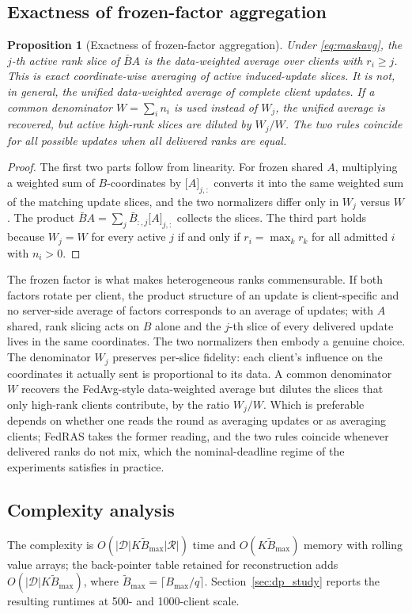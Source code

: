 \documentclass[a4paper,fleqn]{cas-dc}
\newtheorem{proposition}{Proposition}
\begin{document}
\subsection{Exactness of frozen-factor aggregation}
\begin{proposition}[Exactness of frozen-factor aggregation]
\label{prop:agg}
Under \eqref{eq:maskavg}, the $j$-th active rank slice of $\bar BA$ is the data-weighted average over clients with $r_i\ge j$. This is exact coordinate-wise averaging of active induced-update slices. It is not, in general, the unified data-weighted average of complete client updates. If a common denominator $W=\sum_i n_i$ is used instead of $W_j$, the unified average is recovered, but active high-rank slices are diluted by $W_j/W$. The two rules coincide for all possible updates when all delivered ranks are equal.
\end{proposition}
\begin{proof}
The first two parts follow from linearity. For frozen shared $A$, multiplying a weighted sum of $B$-coordinates by $\big[A\big]_{j,:}$ converts it into the same weighted sum of the matching update slices, and the two normalizers differ only in $W_j$ versus $W$. The product $\bar BA=\sum_j\bar B_{:,j}\big[A\big]_{j,:}$ collects the slices. The third part holds because $W_j=W$ for every active $j$ if and only if $r_i=\max_k r_k$ for all admitted $i$ with $n_i>0$.
\end{proof}

The frozen factor is what makes heterogeneous ranks commensurable. If both factors rotate per client, the product structure of an update is client-specific and no server-side average of factors corresponds to an average of updates; with $A$ shared, rank slicing acts on $B$ alone and the $j$-th slice of every delivered update lives in the same coordinates. The two normalizers then embody a genuine choice. The denominator $W_j$ preserves per-slice fidelity: each client's influence on the coordinates it actually sent is proportional to its data. A common denominator $W$ recovers the FedAvg-style data-weighted average but dilutes the slices that only high-rank clients contribute, by the ratio $W_j/W$. Which is preferable depends on whether one reads the round as averaging updates or as averaging clients; FedRAS takes the former reading, and the two rules coincide whenever delivered ranks do not mix, which the nominal-deadline regime of the experiments satisfies in practice.

\subsection{Complexity analysis}
The complexity is $O(|\mathcal D|K\widetilde B_{\max}|\mathcal R|)$ time and $O(K\widetilde B_{\max})$ memory with rolling value arrays; the back-pointer table retained for reconstruction adds $O(|\mathcal D|K\widetilde B_{\max})$, where $\widetilde B_{\max}=\lceil B_{\max}/q\rceil$. Section~\ref{sec:dp_study} reports the resulting runtimes at 500- and 1000-client scale.
\end{document}
